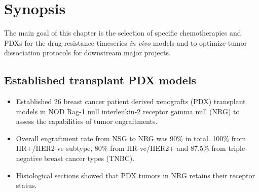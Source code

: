 
\section{Synopsis}
 The main goal of this chapter is the selection of specific chemotherapies and PDXs for the drug resistance timeseries \textit{in vivo} models and to optimize tumor dissociation protocols for downstream major projects. 
 
 
 \subsection{Established transplant PDX models}
 \begin{itemize}
  \item Established 26 breast cancer patient derived xenografts (PDX) transplant models in NOD Rag-1 null interleukin-2 receptor gamma null (NRG) to assess the capabilities of tumor engraftments. 
  \item Overall engraftment rate from NSG to NRG was 90\% in total. 100\% from HR+/HER2-ve subtype,  80\% from HR-ve/HER2+ and 87.5\% from triple-negative breast cancer types (TNBC).
   \item Histological sections showed that PDX tumors in NRG retains their receptor status.
  
  \end{itemize}
  
